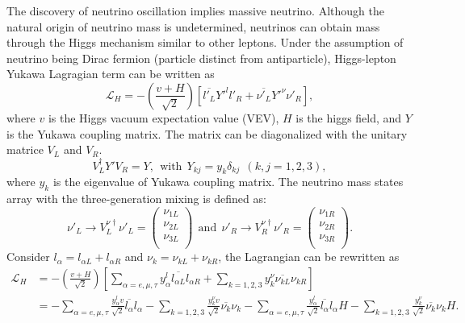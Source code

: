     The discovery of neutrino oscillation implies massive neutrino.
    Although the natural origin of neutrino mass is undetermined, neutrinos can obtain mass through the Higgs mechanism similar to other leptons. 
    Under the assumption of neutrino being Dirac fermion (particle distinct from antiparticle), Higgs-lepton Yukawa Lagragian term can be written as
\begin{equation}\label{eq4}
\mathscr{L}_H = -\left(\frac{v+H}{\sqrt{2}}\right)\left[\overline{l'_L}Y'^{l}l'_R +\overline{\nu'_L}Y'^{\nu}\nu'_R\right],
\end{equation}
    where $v$ is the Higgs vacuum expectation value (VEV), $H$ is the higgs field, and $Y$ is the Yukawa coupling matrix. 
    The matrix can be diagonalized with the unitary matrice $V_L$ and $V_R$.
\begin{equation}\label{eq5}
V^\dagger_LY'V_R = Y,\   \ \textrm{with} \   \ Y_{kj} = y_k\delta_{kj} \   \ (k,j = 1,2,3),
\end{equation}
    where $y_k$ is the eigenvalue of Yukawa coupling matrix. The neutrino mass states array with the three-generation mixing is defined as:
\begin{equation}\label{eq6}
\nu'_L \rightarrow V^{\nu\dagger}_L\nu'_L = \left( \begin{array}{c}
\nu_{1L} \\
\nu_{2L} \\
\nu_{3L} \\
\end{array} \right) \   \ \text{and} \   \ \nu'_R \rightarrow V^{\nu\dagger}_R\nu'_R = \left( \begin{array}{c}
\nu_{1R} \\
\nu_{2R} \\
\nu_{3R} \\
\end{array} \right).
\end{equation}
    Consider $l_\alpha = l_{\alpha L} + l_{\alpha R}$ and $\nu_k = \nu_{kL} + \nu_{kR}$, the Lagrangian can be rewritten as
\begin{equation}\label{eq7}
\begin{aligned}
\mathscr{L}_H & = -\left(\frac{v+H}{\sqrt{2}}\right)\left[ \sum\limits_{\alpha = e, \mu, \tau} y_{\alpha}^l\overline{l_{\alpha L}}l_{\alpha R} + \sum\limits_{k = 1, 2, 3}y_k^\nu \overline{\nu_{kL}}\nu_{kR} \right] \\
& = - \sum\limits_{\alpha = e, \mu, \tau} \frac{y_\alpha^l v}{\sqrt{2}}\overline{l_{\alpha}}l_{\alpha} - \sum\limits_{k = 1, 2, 3} \frac{y_k^\nu v}{\sqrt{2}} \overline{\nu_{k}}\nu_{k} - \sum\limits_{\alpha = e, \mu, \tau} \frac{y_\alpha^l}{\sqrt{2}}\overline{l_{\alpha}}l_{\alpha}H - \sum\limits_{k = 1, 2, 3} \frac{y_k^\nu}{\sqrt{2}} \overline{\nu_{k}}\nu_{k}H.
\end{aligned}
\end{equation}
